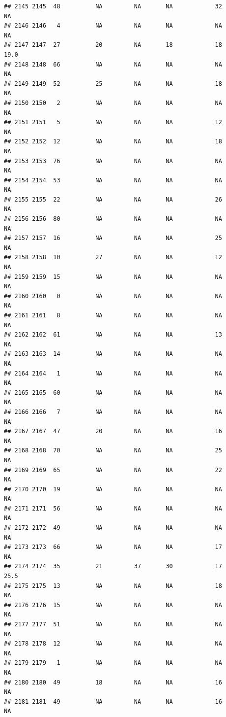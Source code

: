\documentclass[man]{apa6}
\begin{document}
\begin{verbatim}
## 2145 2145  48          NA         NA       NA            32       NA
## 2146 2146   4          NA         NA       NA            NA       NA
## 2147 2147  27          20         NA       18            18     19.0
## 2148 2148  66          NA         NA       NA            NA       NA
## 2149 2149  52          25         NA       NA            18       NA
## 2150 2150   2          NA         NA       NA            NA       NA
## 2151 2151   5          NA         NA       NA            12       NA
## 2152 2152  12          NA         NA       NA            18       NA
## 2153 2153  76          NA         NA       NA            NA       NA
## 2154 2154  53          NA         NA       NA            NA       NA
## 2155 2155  22          NA         NA       NA            26       NA
## 2156 2156  80          NA         NA       NA            NA       NA
## 2157 2157  16          NA         NA       NA            25       NA
## 2158 2158  10          27         NA       NA            12       NA
## 2159 2159  15          NA         NA       NA            NA       NA
## 2160 2160   0          NA         NA       NA            NA       NA
## 2161 2161   8          NA         NA       NA            NA       NA
## 2162 2162  61          NA         NA       NA            13       NA
## 2163 2163  14          NA         NA       NA            NA       NA
## 2164 2164   1          NA         NA       NA            NA       NA
## 2165 2165  60          NA         NA       NA            NA       NA
## 2166 2166   7          NA         NA       NA            NA       NA
## 2167 2167  47          20         NA       NA            16       NA
## 2168 2168  70          NA         NA       NA            25       NA
## 2169 2169  65          NA         NA       NA            22       NA
## 2170 2170  19          NA         NA       NA            NA       NA
## 2171 2171  56          NA         NA       NA            NA       NA
## 2172 2172  49          NA         NA       NA            NA       NA
## 2173 2173  66          NA         NA       NA            17       NA
## 2174 2174  35          21         37       30            17     25.5
## 2175 2175  13          NA         NA       NA            18       NA
## 2176 2176  15          NA         NA       NA            NA       NA
## 2177 2177  51          NA         NA       NA            NA       NA
## 2178 2178  12          NA         NA       NA            NA       NA
## 2179 2179   1          NA         NA       NA            NA       NA
## 2180 2180  49          18         NA       NA            16       NA
## 2181 2181  49          NA         NA       NA            16       NA

\end{verbatim}
\end{document}
